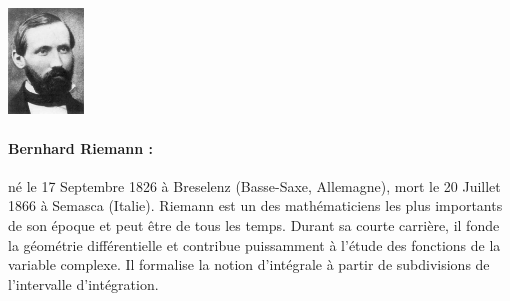 \begin{minipage}{0.2\linewidth}
\begin{center}\includegraphics[width=2cm]{images/Riemann.jpg}\end{center}
\end{minipage}
\begin{minipage}{0.80 \linewidth}
\small{\paragraph*{Bernhard Riemann :} né le  17 Septembre 1826 à Breselenz (Basse-Saxe, Allemagne), mort le 20 Juillet 1866 à Semasca (Italie). Riemann est un des mathématiciens les plus importants de son époque et peut être de tous les temps. Durant sa courte carrière, il fonde la géométrie différentielle et contribue puissamment à l'étude des fonctions de la variable complexe. Il formalise la notion d'intégrale à partir de subdivisions de l'intervalle d'intégration.}
\end{minipage}

\vfill